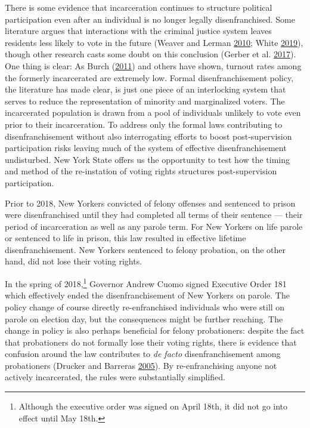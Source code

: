 \documentclass[
  12pt,
]{article}
\begin{document}
There is some evidence that incarceration continues to structure political participation even after an individual is no longer legally disenfranchised. Some literature argues that interactions with the criminal justice system leaves residents less likely to vote in the future (Weaver and Lerman \protect\hyperlink{ref-Weaver2010}{2010}; White \protect\hyperlink{ref-White2019}{2019}), though other research casts some doubt on this conclusion (Gerber et al. \protect\hyperlink{ref-Gerber2017}{2017}). One thing is clear: As Burch (\protect\hyperlink{ref-Burch2011}{2011}) and others have shown, turnout rates among the formerly incarcerated are extremely low. Formal disenfranchisement policy, the literature has made clear, is just one piece of an interlocking system that serves to reduce the representation of minority and marginalized voters. The incarcerated population is drawn from a pool of individuals unlikely to vote even prior to their incarceration. To address only the formal laws contributing to disenfranchisement without also interrogating efforts to boost post-supervision participation risks leaving much of the system of effective disenfranchisement undisturbed. New York State offers us the opportunity to test how the timing and method of the re-instation of voting rights structures post-supervision participation.

Prior to 2018, New Yorkers convicted of felony offenses and sentenced to prison were disenfranchised until they had completed all terms of their sentence --- their period of incarceration as well as any parole term. For New Yorkers on life parole or sentenced to life in prison, this law resulted in effective lifetime disenfranchisement. New Yorkers sentenced to felony probation, on the other hand, did not lose their voting rights.

In the spring of 2018,\footnote{Although the executive order was signed on April 18th, it did not go into effect until May 18th.} Governor Andrew Cuomo signed Executive Order 181 which effectively ended the disenfranchisement of New Yorkers on parole. The policy change of course directly re-enfranchised individuals who were still on parole on election day, but the consequences might be further reaching. The change in policy is also perhaps beneficial for felony probationers: despite the fact that probationers do not formally lose their voting rights, there is evidence that confusion around the law contributes to \emph{de facto} disenfranchisement among probationers (Drucker and Barreras \protect\hyperlink{ref-Drucker2005}{2005}). By re-enfranchising anyone not actively incarcerated, the rules were substantially simplified.
\end{document}
